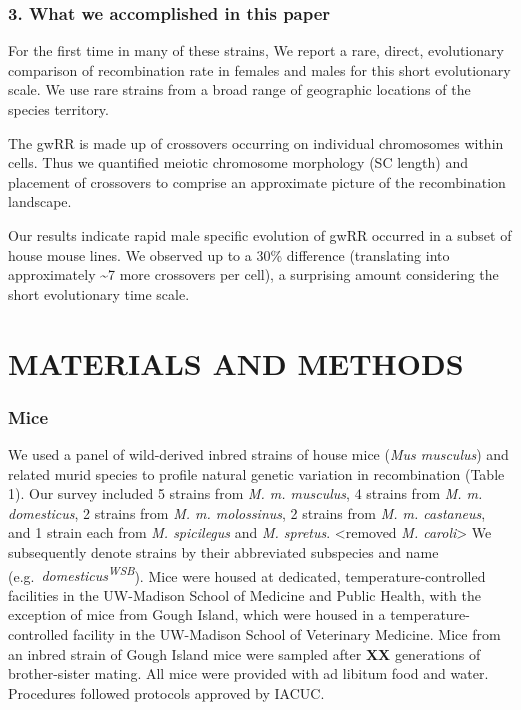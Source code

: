 \documentclass[
]{article}
\begin{document}
\hypertarget{what-we-accomplished-in-this-paper}{%
\subsubsection{3. What we accomplished in this
paper}\label{what-we-accomplished-in-this-paper}}

For the first time in many of these strains, We report a rare, direct,
evolutionary comparison of recombination rate in females and males for
this short evolutionary scale. We use rare strains from a broad range of
geographic locations of the species territory.

The gwRR is made up of crossovers occurring on individual chromosomes
within cells. Thus we quantified meiotic chromosome morphology (SC
length) and placement of crossovers to comprise an approximate picture
of the recombination landscape.

Our results indicate rapid male specific evolution of gwRR occurred in a
subset of house mouse lines. We observed up to a 30\% difference
(translating into approximately \textasciitilde7 more crossovers per
cell), a surprising amount considering the short evolutionary time
scale.

\hypertarget{materials-and-methods}{%
\section{MATERIALS AND METHODS}\label{materials-and-methods}}

\hypertarget{mice}{%
\subsubsection{Mice}\label{mice}}

We used a panel of wild-derived inbred strains of house mice (\emph{Mus
musculus}) and related murid species to profile natural genetic
variation in recombination (Table 1). Our survey included 5 strains from
\emph{M. m. musculus}, 4 strains from \emph{M. m. domesticus}, 2 strains
from \emph{M. m. molossinus}, 2 strains from \emph{M. m. castaneus}, and
1 strain each from \emph{M. spicilegus} and \emph{M. spretus}.
\textless removed \emph{M. caroli}\textgreater{} We subsequently denote
strains by their abbreviated subspecies and name
(e.g.~\emph{domesticus\textsuperscript{WSB}}). Mice were housed at
dedicated, temperature-controlled facilities in the UW-Madison School of
Medicine and Public Health, with the exception of mice from Gough
Island, which were housed in a temperature-controlled facility in the
UW-Madison School of Veterinary Medicine. Mice from an inbred strain of
Gough Island mice were sampled after \textbf{XX} generations of
brother-sister mating. All mice were provided with ad libitum food and
water. Procedures followed protocols approved by IACUC.
\end{document}
